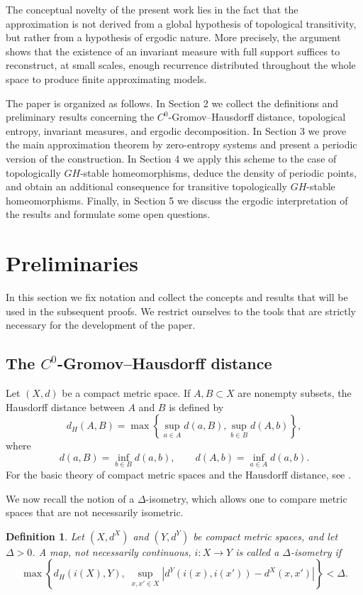 \documentclass{amsart}
\numberwithin{equation}{section}
\newtheorem{definition}[theorem]{Definition}
\theoremstyle{remark}
\begin{document}
The conceptual novelty of the present work lies in the fact that the approximation is not derived from a global hypothesis of topological transitivity, but rather from a hypothesis of ergodic nature. More precisely, the argument shows that the existence of an invariant measure with full support suffices to reconstruct, at small scales, enough recurrence distributed throughout the whole space to produce finite approximating models.

The paper is organized as follows. In Section 2 we collect the definitions and preliminary results concerning the $C^0$-Gromov--Hausdorff distance, topological entropy, invariant measures, and ergodic decomposition. In Section 3 we prove the main approximation theorem by zero-entropy systems and present a periodic version of the construction. In Section 4 we apply this scheme to the case of topologically $GH$-stable homeomorphisms, deduce the density of periodic points, and obtain an additional consequence for transitive topologically $GH$-stable homeomorphisms. Finally, in Section 5 we discuss the ergodic interpretation of the results and formulate some open questions.

\section{Preliminaries}

In this section we fix notation and collect the concepts and results that will be used in the subsequent proofs. We restrict ourselves to the tools that are strictly necessary for the development of the paper.

\subsection{The $C^0$-Gromov--Hausdorff distance}

Let $(X,d)$ be a compact metric space. If $A,B\subset X$ are nonempty subsets, the Hausdorff distance between $A$ and $B$ is defined by
\[
d_H(A,B)=\max\left\{\sup_{a\in A}d(a,B),\sup_{b\in B}d(A,b)\right\},
\]
where
\[
d(a,B)=\inf_{b\in B}d(a,b),
\qquad
d(A,b)=\inf_{a\in A}d(a,b).
\]
For the basic theory of compact metric spaces and the Hausdorff distance, see \cite{burago2001,gromov2007}.

We now recall the notion of a $\Delta$-isometry, which allows one to compare metric spaces that are not necessarily isometric.

\begin{definition}
Let $(X,d^X)$ and $(Y,d^Y)$ be compact metric spaces, and let $\Delta>0$. A map, not necessarily continuous, $i:X\to Y$ is called a \emph{$\Delta$-isometry} if
\[
\max\left\{
d_H(i(X),Y),\;
\sup_{x,x'\in X}\left|d^Y(i(x),i(x'))-d^X(x,x')\right|
\right\}<\Delta.
\]
\end{definition}
\end{document}
